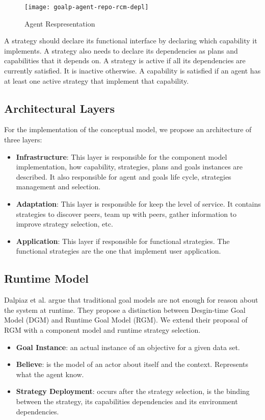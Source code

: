 \begin{figure}
  \centering
  \texttt{[image: goalp-agent-repo-rcm-depl]}
  \caption{Agent Respresentation}
  \label{fig:goalp-agent}
\end{figure}

A strategy should declare its functional interface by declaring which capability it implements. A strategy also needs to declare its dependencies as plans and capabilities that it depends on. A strategy is active if all its dependencies are currently satisfied. It is inactive otherwise. A capability is satisfied if an agent has at least one active strategy that implement that capability.

\subsection{Architectural Layers}

For the implementation of the conceptual model, we propose an architecture of three layers:

\begin{itemize}
  \item \textbf{Infrastructure}: This layer is responsible for the component model implementation, how capability, strategies, plans and goals instances are described. It also responsible for agent and goals life cycle, strategies management and selection.
  \item \textbf{Adaptation}: This layer is responsible for keep the level of service. It contains strategies to discover peers, team up with peers, gather information to improve strategy selection, etc.
  \item \textbf{Application}: This layer if responsible for functional strategies. The functional strategies are the one that implement user application.
\end{itemize}

\subsection{Runtime Model}

Dalpiaz et al. \cite{dalpiaz_runtime_2013} argue that traditional goal models are not enough for reason about the system at runtime. They propose a distinction between Desgin-time Goal Model (DGM) and Runtime Goal Model (RGM). We extend their proposal of RGM with a component model and runtime strategy selection.

\begin{itemize}

\item \textbf{Goal Instance}: an actual instance of an objective for a given data set.

\item \textbf{Believe}: is the model of an actor about itself and the context. Represents what the agent know.

\item \textbf{Strategy Deployment}: occurs after the strategy selection, is the binding between the strategy, its capabilities dependencies and its environment dependencies.

\end{itemize}


